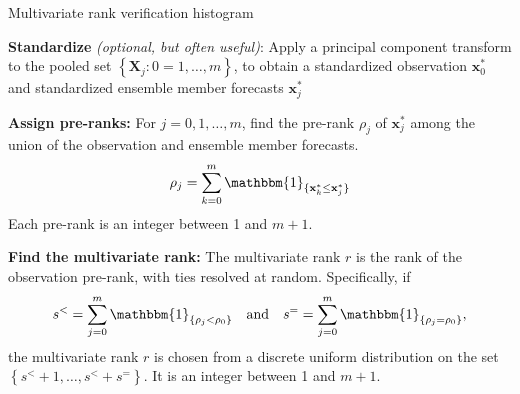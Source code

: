 \documentclass[10pt,fleqn]{article}
\begin{document}
\begin{algorithm}%
    \caption{Multivariate rank verification histogram}
	\label{alg:mv-rank-hist}
\vspace{5pt}


    		 
    \vspace{5pt}


\textbf{Standardize} \textit{(optional, but often useful)}:
Apply a principal component transform to the pooled set $\left\{ \mathbf{X}_j:0=1, \dots, m \right\}$, to obtain a standardized observation $\mathbf{x}_0^*$ and standardized ensemble member forecasts $\mathbf{x}_j^*$
%
\vspace{5pt}


\textbf{Assign pre-ranks:}
For $j = 0, 1, \dots, m$, find the pre-rank $\rho_j$ of $\mathbf{x}_j^*$ among the union of the observation and ensemble member forecasts. 
%
\[ \rho_j = \sum_{k=0}^m \mathbbm{1}_{\{ \mathbf{x}_k^* \le \mathbf{x}_j^*\}} \]
%
Each pre-rank is an integer between 1 and $m+1$.
%
\vspace{5pt}


\textbf{Find the multivariate rank:} The multivariate rank $r$ is the rank of the observation pre-rank, with ties resolved at random. Specifically, if
%
\begin{align*}
s^< = \sum_{j=0}^m \mathbbm{1}_{\{\rho_j < \rho_0\}} && \text{and} && s^= = \sum_{j=0}^m \mathbbm{1}_{\{\rho_j = \rho_0\}}, 
\end{align*}
%
the multivariate rank $r$ is chosen from a discrete uniform distribution on the set $\left \{ s^< + 1, \dots, s^< + s^= \right\}$. It is an integer between 1 and $m+1$.
%
\vspace{5pt}

\end{algorithm}
\end{document}
